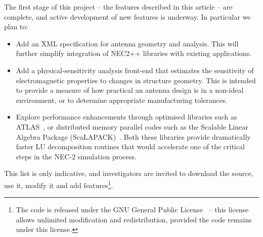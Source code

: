 \documentclass{report}
\begin{document}
The first stage of this project -- the features described in this article -- are complete, and active development of new features is underway. In particular we plan to:
\begin{itemize}
\item Add an XML specification for antenna geometry and analysis. This will further simplify integration of NEC2++ libraries with existing applications.
\item Add a physical-sensitivity analysis front-end that estimates the sensitivity of electromagnetic properties to changes in structure geometry. This is intended to provide a measure of how practical an antenna design is in a non-ideal environment, or to determine appropriate manufacturing tolerances.
\item Explore performance enhancements through optimised libraries such as ATLAS~\cite{Whaley2001}, or distributed memory parallel codes such as the Scalable Linear Algebra Package (ScaLAPACK)~\cite{SCALAPACK}. Both these libraries provide dramatically faster LU decomposition routines that would accelerate one of the critical steps in the NEC-2 simulation process.
\end{itemize}
This list is only indicative, and investigators are invited to download the source, use it,  modify it and add features\footnote{The code is released under the GNU General Public License~\cite{GPL} -- this license allows unlimited modification and redistribution, provided the code remains under this license.}.




 
\end{document}
